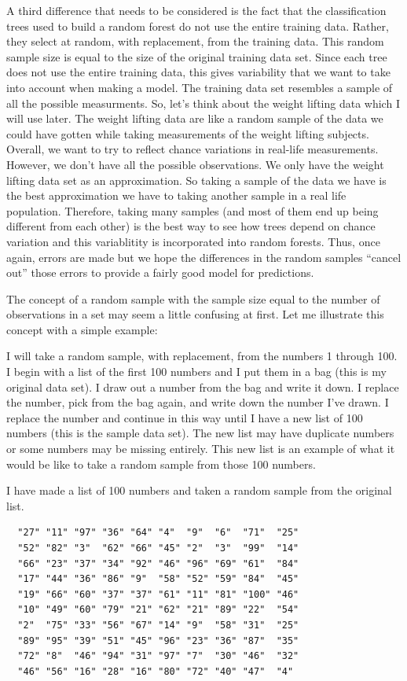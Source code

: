 \documentclass[12pt,twoside]{reedthesis}
\begin{document}
  A third difference that needs to be considered is the fact that the
  classification trees used to build a random forest do not use the entire
  training data. Rather, they select at random, with replacement, from the
  training data. This random sample size is equal to the size of the
  original training data set. Since each tree does not use the entire
  training data, this gives variability that we want to take into account
  when making a model. The training data set resembles a sample of all the
  possible measurments. So, let's think about the weight lifting data
  which I will use later. The weight lifting data are like a random sample
  of the data we could have gotten while taking measurements of the weight
  lifting subjects. Overall, we want to try to reflect chance variations
  in real-life measurements. However, we don't have all the possible
  observations. We only have the weight lifting data set as an
  approximation. So taking a sample of the data we have is the best
  approximation we have to taking another sample in a real life
  population. Therefore, taking many samples (and most of them end up
  being different from each other) is the best way to see how trees depend
  on chance variation and this variablitity is incorporated into random
  forests. Thus, once again, errors are made but we hope the differences
  in the random samples ``cancel out'' those errors to provide a fairly
  good model for predictions.
  
  The concept of a random sample with the sample size equal to the number
  of observations in a set may seem a little confusing at first. Let me
  illustrate this concept with a simple example:
  
  I will take a random sample, with replacement, from the numbers 1
  through 100. I begin with a list of the first 100 numbers and I put them
  in a bag (this is my original data set). I draw out a number from the
  bag and write it down. I replace the number, pick from the bag again,
  and write down the number I've drawn. I replace the number and continue
  in this way until I have a new list of 100 numbers (this is the sample
  data set). The new list may have duplicate numbers or some numbers may
  be missing entirely. This new list is an example of what it would be
  like to take a random sample from those 100 numbers.
  
  I have made a list of 100 numbers and taken a random sample from the
  original list.
  
  \begin{verbatim}
  "27" "11" "97" "36" "64" "4"  "9"  "6"  "71"  "25" 
  "52" "82" "3"  "62" "66" "45" "2"  "3"  "99"  "14" 
  "66" "23" "37" "34" "92" "46" "96" "69" "61"  "84" 
  "17" "44" "36" "86" "9"  "58" "52" "59" "84"  "45" 
  "19" "66" "60" "37" "37" "61" "11" "81" "100" "46" 
  "10" "49" "60" "79" "21" "62" "21" "89" "22"  "54" 
  "2"  "75" "33" "56" "67" "14" "9"  "58" "31"  "25" 
  "89" "95" "39" "51" "45" "96" "23" "36" "87"  "35" 
  "72" "8"  "46" "94" "31" "97" "7"  "30" "46"  "32" 
  "46" "56" "16" "28" "16" "80" "72" "40" "47"  "4"  
  \end{verbatim}
  
\end{document}
